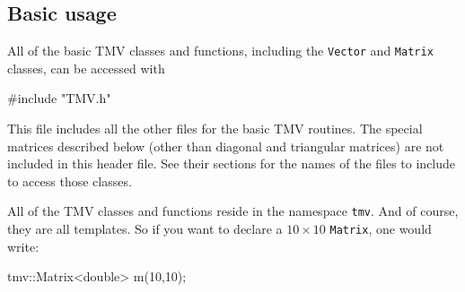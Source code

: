 \documentclass[twoside,letterpaper,11pt]{article}
\renewcommand{\tt}[1]{{\lstinline {#1}}}
\begin{document}
\begin{enumerate}
\begin{comment}
\item
\textbf{Comments}

The code is highly commented, especially for the more complicated algorithms.
I have this egotistical quirk that I need to understand all of the code I write.
So none of the algorithms are just taken verbatim from LAPACK or anything like that.
I force myself to understand the algorithm (usually from Golub and van Loan,
but sometimes from a journal article or something I find on the net),
write a long comment explaining how it works, and then finally write the code
from scratch.  Then I usually compare my code to the LAPACK version, at which point
I have occasionally found ways to either speed it up or make it more accurate
(which also get commented, of course).

But the point is - if you want to understand how, say, the blocked Bunch-Kaufman
algorithm works, you'll probably do better looking at the comment in the 
TMV code than trying to decipher the LAPACK routines.  Plus, the code itself is
usually a lot more readable, since the arithmetic is written with the operator
overloads and such rather than the cryptic BLAS function names.
\end{comment}

\end{enumerate}

\subsection{Basic usage}

All of the basic TMV classes and functions, including the \tt{Vector} and \tt{Matrix} 
classes, can be accessed with
\begin{tmvcode}
#include "TMV.h"
\end{tmvcode}
This file includes all the other files for the basic TMV routines.  The 
special matrices described below (other than diagonal and triangular matrices) 
are not included in this header file.
See their sections for the names
of the files to include to access those classes.

All of the TMV classes and functions reside in the namespace \tt{tmv}. 
And of course, they are all templates.
So if you want to declare a $10 \times 10$ \tt{Matrix}, one would write:
\begin{tmvcode}
tmv::Matrix<double> m(10,10);
\end{tmvcode}
\end{document}
